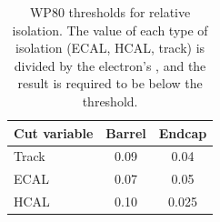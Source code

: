 \begin{table}[htbp]
  \begin{center}
    \caption[WP80 thresholds for relative isolation]
    {\fixspacing WP80 thresholds for relative isolation.
    The value of each type of isolation (ECAL, HCAL, track) 
    is divided by the electron's \pt, and the result is 
    required to be below the threshold.  
    }
    \label{TableEisoCuts}
    \begin{tabular}[]{ | l | c | c | }
      \hline
      Cut variable & Barrel & Endcap  \\ \hline \hline
      Track & 0.09 & 0.04 \\ \hline
      ECAL & 0.07 & 0.05  \\ \hline
      HCAL & 0.10 & 0.025  \\ %
      \hline
    \end{tabular}
  \end{center}
\end{table}




